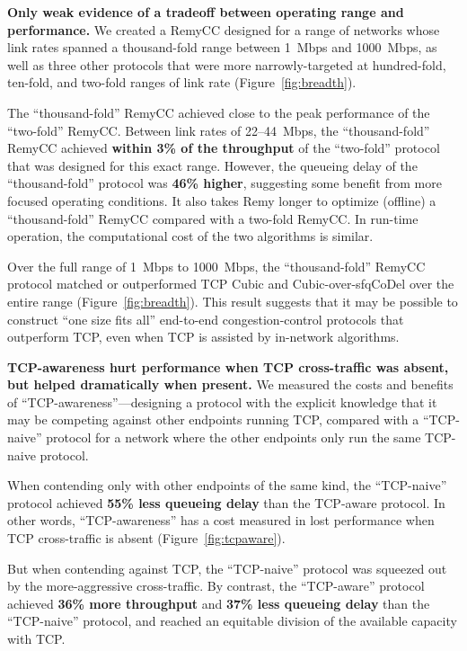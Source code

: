 \noindent 
\textbf{Only weak evidence of a tradeoff between
  operating range and performance.} We created a RemyCC designed
for a range of networks whose link rates spanned a thousand-fold range
between 1~Mbps and 1000~Mbps, as well as three other protocols that
were more narrowly-targeted at hundred-fold, ten-fold, and two-fold
ranges of link rate (Figure~\ref{fig:breadth}).

The ``thousand-fold'' RemyCC achieved close to the peak performance of
the ``two-fold'' RemyCC. Between link rates of 22--44~Mbps, the
``thousand-fold'' RemyCC achieved \textbf{within 3\% of the throughput}
of the ``two-fold'' protocol that was designed for this exact
range. However, the queueing delay of the ``thousand-fold'' protocol
was \textbf{46\% higher}, suggesting some benefit from more focused
operating conditions. It also takes Remy longer to optimize (offline)
a ``thousand-fold'' RemyCC compared with a two-fold RemyCC. In run-time
operation, the computational cost of the two algorithms is
similar.

Over the full range of 1~Mbps to 1000~Mbps, the ``thousand-fold''
RemyCC protocol matched or outperformed TCP Cubic and
Cubic-over-sfqCoDel over the entire range
(Figure~\ref{fig:breadth}). This result suggests that it may be
possible to construct ``one size fits all'' end-to-end
congestion-control protocols that outperform TCP, even when TCP is
assisted by in-network algorithms.

\vspace{\baselineskip}

\noindent \textbf{TCP-awareness hurt performance when TCP
  cross-traffic was absent, but helped dramatically when present.} We
measured the costs and benefits of ``TCP-awareness''---designing a
protocol with the explicit knowledge that it may be competing against
other endpoints running TCP, compared with a ``TCP-naive'' protocol
for a network where the other endpoints only run the same TCP-naive
protocol.

When contending only with other endpoints of the same kind, the
``TCP-naive'' protocol achieved \textbf{55\% less queueing delay} than
the TCP-aware protocol. In other words, ``TCP-awareness'' has a cost
measured in lost performance when TCP cross-traffic is absent
(Figure~\ref{fig:tcpaware}).

But when contending against TCP, the ``TCP-naive'' protocol was
squeezed out by the more-aggressive cross-traffic. By contrast, the
``TCP-aware'' protocol achieved \textbf{36\% more throughput} and
\textbf{37\% less queueing delay} than the ``TCP-naive'' protocol,
and reached an equitable division of the available capacity with TCP.
